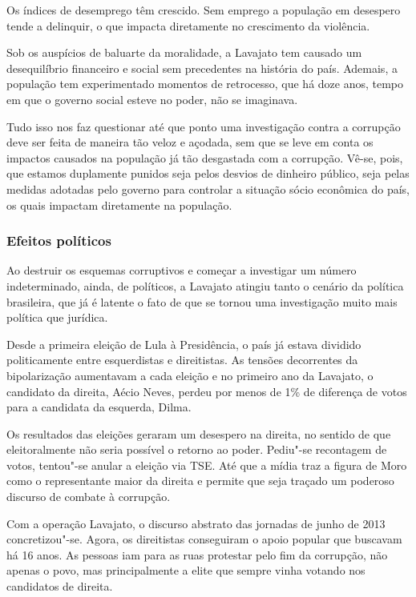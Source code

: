 {Os índices de desemprego têm crescido. Sem emprego a população em
desespero tende a delinquir, o que impacta diretamente no crescimento da
violência.

Sob os auspícios de baluarte da moralidade, a Lavajato tem causado um
desequilíbrio financeiro e social sem precedentes na história do país.
Ademais, a população tem experimentado momentos de retrocesso, que há
doze anos, tempo em que o governo social esteve no poder, não se
imaginava.

Tudo isso nos faz questionar até que ponto uma investigação contra a
corrupção deve ser feita de maneira tão veloz e açodada, sem que se leve
em conta os impactos causados na população já tão desgastada com a
corrupção. Vê-se, pois, que estamos duplamente punidos seja pelos
desvios de dinheiro público, seja pelas medidas adotadas pelo governo
para controlar a situação sócio econômica do país, os quais impactam
diretamente na população.

\subsubsection{Efeitos políticos}

Ao destruir os esquemas corruptivos e começar a investigar um número
indeterminado, ainda, de políticos, a Lavajato atingiu tanto o cenário
da política brasileira, que já é latente o fato de que se tornou uma
investigação muito mais política que jurídica.

Desde a primeira eleição de Lula à Presidência, o país já estava
dividido politicamente entre esquerdistas e direitistas. As tensões
decorrentes da bipolarização aumentavam a cada eleição e no primeiro ano
da Lavajato, o candidato da direita, Aécio Neves, perdeu por menos de
1\% de diferença de votos para a candidata da esquerda, Dilma.

Os resultados das eleições geraram um desespero na direita, no sentido
de que eleitoralmente não seria possível o retorno ao poder. Pediu"-se
recontagem de votos, tentou"-se anular a eleição via TSE. Até que a mídia
traz a figura de Moro como o representante maior da direita e permite
que seja traçado um poderoso discurso de combate à corrupção.

Com a operação Lavajato, o discurso abstrato das jornadas de junho de
2013 concretizou"-se. Agora, os direitistas conseguiram o apoio popular
que buscavam há 16 anos. As pessoas iam para as ruas protestar pelo fim
da corrupção, não apenas o povo, mas principalmente a elite que sempre
vinha votando nos candidatos de direita.

}
